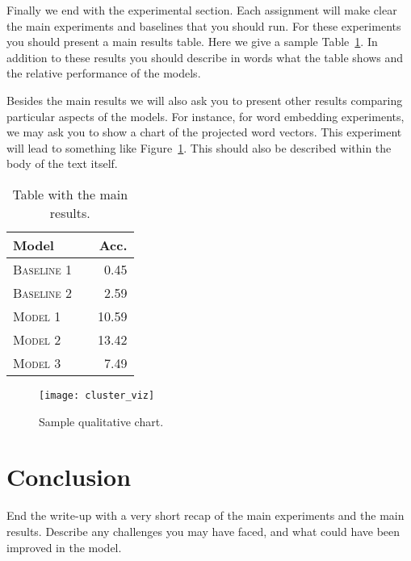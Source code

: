 \documentclass[11pt]{article}
\begin{document}
Finally we end with the experimental section. Each assignment will make clear the main experiments and baselines that you should run. For these experiments you should present a main results table. Here we give a sample Table~\ref{tab:results}. In addition to these results you should describe in words what the table shows and the relative performance of the models.

Besides the main results we will also ask you to present other results
comparing particular aspects of the models. For instance, for word
embedding experiments, we may ask you to show a chart of the projected
word vectors. This experiment will lead to something like
Figure~\ref{fig:clusters}. This should also be described within the
body of the text itself.


\begin{table}[h]
\centering
\begin{tabular}{llr}
 \toprule
 Model &  & Acc. \\
 \midrule
 \textsc{Baseline 1} & & 0.45\\
 \textsc{Baseline 2} & & 2.59 \\
 \textsc{Model 1} & & 10.59  \\
 \textsc{Model 2} & &13.42 \\
 \textsc{Model 3} & & 7.49\\
 \bottomrule
\end{tabular}
\caption{\label{tab:results} Table with the main results.}
\end{table}


\begin{figure}
  \centering
  \texttt{[image: cluster\_viz]}
  \caption{\label{fig:clusters} Sample qualitative chart.}
\end{figure}


\section{Conclusion}

End the write-up with a very short recap of the main experiments and the main results. Describe any challenges you may have faced, and what could have been improved in the model.



\end{document}
